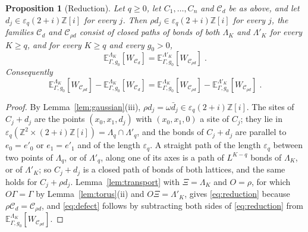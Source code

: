 \documentclass[11pt]{preprint}
\numberwithin{equation}{section}
\newtheorem{proposition}[theorem]{Proposition}
\theoremstyle{definition}
\theoremstyle{remark}
\theoremstyle{plain}
\begin{document}
\begin{proposition}[Reduction]\label{prop:reduction}
Let $q \geq 0$, let $C_1, \dots, C_n$ and $\mathcal C_d$ be as above, and let $d_j \in \varepsilon_q(2 + i)\mathbb Z[i]$ for every $j$. Then $\rho d_j \in \varepsilon_q(2 + i)\mathbb Z[i]$ for every $j$, the families $\mathcal C_d$ and $\mathcal C_{\rho d}$ consist of closed paths of bonds of both $\Lambda_K$ and $\Lambda'_K$ for every $K \geq q$, and for every $K \geq q$ and every $g_0 > 0$,
\begin{equation}\label{eq:reduction}
    \mathbb E^{\Lambda_K}_{\Gamma,g_0}[W_{\mathcal C_d}] = \mathbb E^{\Lambda'_K}_{\Gamma,g_0}[W_{\mathcal C_{\rho d}}]\;.
\end{equation}
Consequently
\begin{equation}\label{eq:defect}
    \mathbb E^{\Lambda_K}_{\Gamma,g_0}[W_{\mathcal C_{\rho d}}] - \mathbb E^{\Lambda_K}_{\Gamma,g_0}[W_{\mathcal C_d}] = \mathbb E^{\Lambda_K}_{\Gamma,g_0}[W_{\mathcal C_{\rho d}}] - \mathbb E^{\Lambda'_K}_{\Gamma,g_0}[W_{\mathcal C_{\rho d}}]\;.
\end{equation}
\end{proposition}

\begin{proof}
By Lemma~\ref{lem:gaussian}(iii), $\rho d_j = \omega\bar d_j \in \varepsilon_q(2 + i)\mathbb Z[i]$. The sites of $C_j + d_j$ are the points $(x_0, x_1, d_j)$ with $(x_0, x_1, 0)$ a site of $C_j$; they lie in $\varepsilon_q(\mathbb Z^2 \times (2 + i)\mathbb Z[i]) = \Lambda_q \cap \Lambda'_q$, and the bonds of $C_j + d_j$ are parallel to $e_0 = e'_0$ or $e_1 = e'_1$ and of the length $\varepsilon_q$. A straight path of the length $\varepsilon_q$ between two points of $\Lambda_q$, or of $\Lambda'_q$, along one of its axes is a path of $L^{K-q}$ bonds of $\Lambda_K$, or of $\Lambda'_K$; so $C_j + d_j$ is a closed path of bonds of both lattices, and the same holds for $C_j + \rho d_j$. Lemma~\ref{lem:transport} with $\Xi = \Lambda_K$ and $O = \rho$, for which $O\Gamma = \Gamma$ by Lemma~\ref{lem:torus}(ii) and $O\Xi = \Lambda'_K$, gives \eqref{eq:reduction} because $\rho\mathcal C_d = \mathcal C_{\rho d}$, and \eqref{eq:defect} follows by subtracting both sides of \eqref{eq:reduction} from $\mathbb E^{\Lambda_K}_{\Gamma,g_0}[W_{\mathcal C_{\rho d}}]$.
\end{proof}
\end{document}

